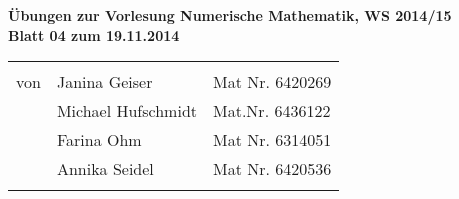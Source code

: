 \documentclass[11pt]{article}
\begin{document}
\begin{center}
\textbf{
Übungen zur Vorlesung Numerische Mathematik, WS 2014/15\\
Blatt 04 zum 19.11.2014\\
}

\begin{tabular}{lll}
& \\
von & Janina Geiser & Mat Nr. 6420269\\
& Michael Hufschmidt & Mat.Nr. 6436122\\
& Farina Ohm & Mat Nr. 6314051\\
& Annika Seidel & Mat Nr. 6420536\\
\\
\hline
\end{tabular}
\end{center}






\end{document}
